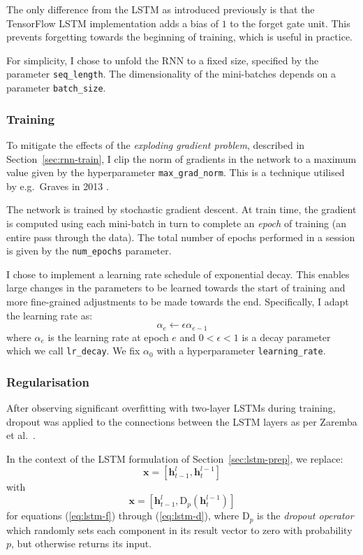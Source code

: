 \documentclass[12pt,a4paper,twoside,openright]{report}
\newcommand{\vect}[1]{\boldsymbol{\mathbf{#1}}}
\begin{document}
The only difference from the LSTM as introduced previously is that the
TensorFlow LSTM implementation adds a bias of $1$ to the forget gate unit. This
prevents forgetting towards the beginning of training, which is useful in
practice.

For simplicity, I chose to unfold the RNN to a fixed size, specified by the
parameter \texttt{seq\_length}. The dimensionality of the mini-batches depends
on a parameter \texttt{batch\_size}.

\subsubsection{Training}

To mitigate the effects of the \emph{exploding gradient problem}, described in
Section~\ref{sec:rnn-train}, I clip the norm of gradients in the network to a
maximum value given by the hyperparameter \texttt{max\_grad\_norm}. This is a
technique utilised by e.g.\ Graves in 2013 \cite{graves2013generating}.

The network is trained by stochastic gradient descent. At train time, the
gradient is computed using each mini-batch in turn to complete an \emph{epoch}
of training (an entire pass through the data). The total number of epochs
performed in a session is given by the \texttt{num\_epochs} parameter.

I chose to implement a learning rate schedule of exponential decay. This enables
large changes in the parameters to be learned towards the start of training and
more fine-grained adjustments to be made towards the end. Specifically, I adapt
the learning rate as:
$$ \alpha_e \gets \epsilon\alpha_{e-1} $$
where $\alpha_e$ is the learning rate at epoch $e$ and $0 < \epsilon < 1$ is a
decay parameter which we call \texttt{lr\_decay}. We fix $\alpha_0$ with a
hyperparameter \texttt{learning\_rate}.

\subsubsection{Regularisation}

After observing significant overfitting with two-layer LSTMs during training,
dropout was applied to the connections between the LSTM layers as per Zaremba et
al.\ \cite{zaremba2014recurrent}.

In the context of the LSTM formulation of Section~\ref{sec:lstm-prep}, we
replace:
$$ \vect{x} = [\vect{h}_{t-1}^l, \vect{h}_t^{l-1}] $$
with
$$ \vect{x} = [\vect{h}_{t-1}^l, \mathrm{D}_p(\vect{h}_t^{l-1})] $$
for equations (\ref{eq:lstm-f}) through (\ref{eq:lstm-d}), where $\mathrm{D}_p$
is the \emph{dropout operator} which randomly sets each component in its result
vector to zero with probability $p$, but otherwise returns its input. 
\end{document}
